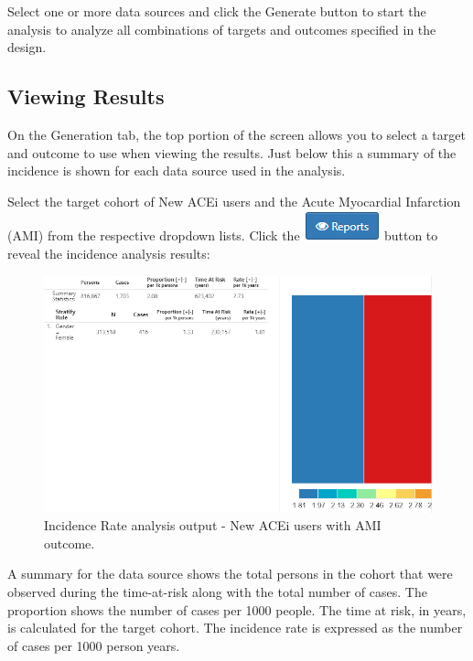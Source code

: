 \documentclass[11pt]{book}
\theoremstyle{definition}
\theoremstyle{definition}
\theoremstyle{definition}
\theoremstyle{remark}
\begin{document}
Select one or more data sources and click the Generate button to start the analysis to analyze all combinations of targets and outcomes specified in the design.

\hypertarget{viewing-results-1}{%
\subsection{Viewing Results}\label{viewing-results-1}}

On the Generation tab, the top portion of the screen allows you to select a target and outcome to use when viewing the results. Just below this a summary of the incidence is shown for each data source used in the analysis.

Select the target cohort of New ACEi users and the Acute Myocardial Infarction (AMI) from the respective dropdown lists. Click the \includegraphics{images/Characterization/atlasIncidenceReportButton.png} button to reveal the incidence analysis results:

\begin{figure}

{\centering \includegraphics[width=1\linewidth]{images/Characterization/atlasIncidenceResults} 

}

\caption{Incidence Rate analysis output - New ACEi users with AMI outcome.}\label{fig:atlasIncidenceResults}
\end{figure}

A summary for the data source shows the total persons in the cohort that were observed during the time-at-risk along with the total number of cases. The proportion shows the number of cases per 1000 people. The time at risk, in years, is calculated for the target cohort. The incidence rate is expressed as the number of cases per 1000 person years.
\end{document}
